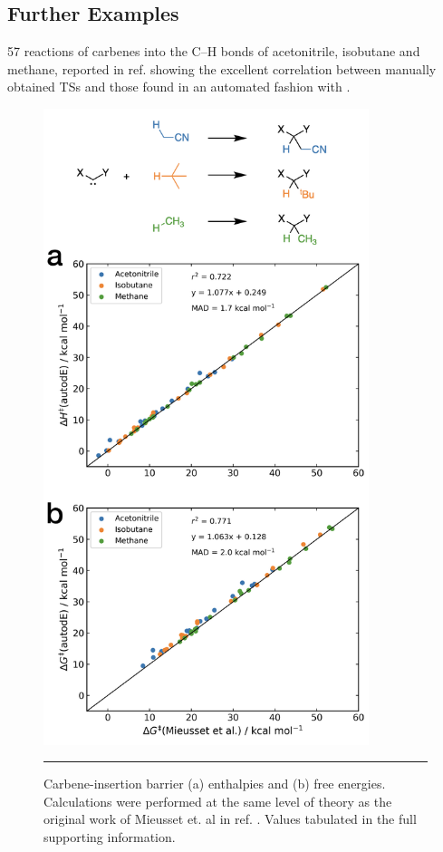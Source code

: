 \documentclass[../../main.tex]{subfiles}
\begin{document}
\iffalse

\clearpage
\subsection{Further Examples}

57 reactions of carbenes into the C–H bonds of acetonitrile, isobutane and methane, reported in ref.\cite{Mieusset2008} showing the excellent correlation between manually obtained TSs and those found in an automated fashion with \ade.


\begin{figure}[h!]
	\vspace{0.4cm}
	\centering
	\includegraphics[width=9.5cm]{5/autode/figs/figS24}
	\vspace{0.2cm}
	\hrule
	\caption{Carbene-insertion barrier (a) enthalpies and (b) free energies. Calculations were performed at the same level of theory as the original work of Mieusset et. al in ref. \cite{Mieusset2008}. Values tabulated in the full supporting information.}
	\label{fig::ade_si_24}
\end{figure}
\end{document}
